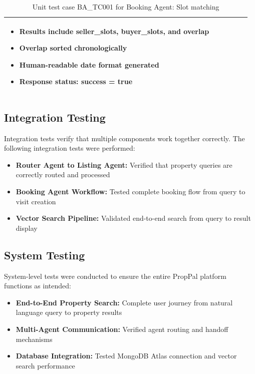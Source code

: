 \begin{table}[H]
{\begin{tabular}{|p{2cm}|p{3cm}|p{3.5cm}|p{4cm}|p{3.2cm}|p{3.3cm}|}
\begin{minipage}[t]{3.3cm}
\begin{itemize}
    \item Results include seller\_slots, buyer\_slots, and overlap
    \item Overlap sorted chronologically
    \item Human-readable date format generated
    \item Response status: success = true
\end{itemize}
\end{minipage} \\ \hline
\end{tabular}%
}
\caption{Unit test case BA\_TC001 for Booking Agent: Slot matching}
\label{tab:test_booking_agent}
\end{table}

\subsection{Integration Testing}

Integration tests verify that multiple components work together correctly. The following integration tests were performed:

\begin{itemize}
    \item \textbf{Router Agent to Listing Agent:} Verified that property queries are correctly routed and processed
    \item \textbf{Booking Agent Workflow:} Tested complete booking flow from query to visit creation
    \item \textbf{Vector Search Pipeline:} Validated end-to-end search from query to result display
\end{itemize}

\subsection{System Testing}

System-level tests were conducted to ensure the entire PropPal platform functions as intended:

\begin{itemize}
    \item \textbf{End-to-End Property Search:} Complete user journey from natural language query to property results
    \item \textbf{Multi-Agent Communication:} Verified agent routing and handoff mechanisms
    \item \textbf{Database Integration:} Tested MongoDB Atlas connection and vector search performance
\end{itemize}



